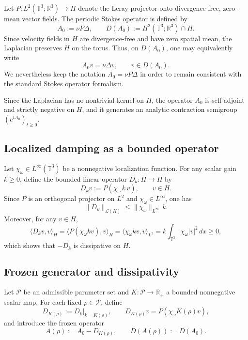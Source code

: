 \documentclass[preprint,12pt]{elsarticle}
\begin{document}
Let $P:L^2(\mathbb{T}^3;\mathbb{R}^3)\to H$ denote the Leray projector onto
divergence-free, zero-mean vector fields.
The periodic Stokes operator is defined by
\[
A_0 := \nu P\Delta,
\qquad
D(A_0):= H^2(\mathbb{T}^3;\mathbb{R}^3)\cap H.
\]
Since velocity fields in $H$ are divergence-free and have zero spatial mean, the
Laplacian preserves $H$ on the torus.
Thus, on $D(A_0)$, one may equivalently write
\[
A_0 v = \nu \Delta v,
\qquad v\in D(A_0).
\]
We nevertheless keep the notation $A_0=\nu P\Delta$ in order to remain consistent
with the standard Stokes operator formalism.

Since the Laplacian has no nontrivial kernel on $H$, the operator $A_0$ is
self-adjoint and strictly negative on $H$, and it generates an analytic
contraction semigroup $(e^{tA_0})_{t\ge0}$.

\subsection{Localized damping as a bounded operator}

Let $\chi_\omega\in L^\infty(\mathbb{T}^3)$ be a nonnegative localization
function.
For any scalar gain $k\ge0$, define the bounded linear operator $D_k:H\to H$ by
\[
D_k v := P(\chi_\omega\,k\,v), \qquad v\in H.
\]
Since $P$ is an orthogonal projector on $L^2$ and $\chi_\omega\in L^\infty$, one
has
\[
\|D_k\|_{\mathcal L(H)} \le \|\chi_\omega\|_{L^\infty}\,k.
\]
Moreover, for any $v\in H$,
\begin{equation}
\label{eq:Dk_positive}
\langle D_k v, v\rangle_H
=
\langle P(\chi_\omega kv),v\rangle_H
=
\langle \chi_\omega kv,v\rangle_{L^2}
=
k\int_{\mathbb{T}^3}\chi_\omega |v|^2\,dx \ge 0,
\end{equation}
which shows that $-D_k$ is dissipative on $H$.

\subsection{Frozen generator and dissipativity}

Let $\mathcal P$ be an admissible parameter set and
$K:\mathcal P\to\mathbb{R}_+$ a bounded nonnegative scalar map.
For each fixed $\rho\in\mathcal P$, define
\[
D_{K(\rho)} := D_k\big|_{k=K(\rho)},\qquad
D_{K(\rho)}v=P(\chi_\omega K(\rho)v),
\]
and introduce the frozen operator
\begin{equation}
\label{eq:Afrozen}
A(\rho):=A_0-D_{K(\rho)},
\qquad
D(A(\rho)):=D(A_0).
\end{equation}
\end{document}
